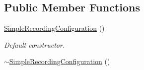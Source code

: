 \subsection*{Public Member Functions}
\begin{DoxyCompactItemize}
\item 
\hypertarget{class_simple_recording_configuration_a97fce15654a90e949196a0ba9c0b32e6}{}\hyperlink{class_simple_recording_configuration_a97fce15654a90e949196a0ba9c0b32e6}{Simple\+Recording\+Configuration} ()\label{class_simple_recording_configuration_a97fce15654a90e949196a0ba9c0b32e6}

\begin{DoxyCompactList}\small\item\em Default constructor. \end{DoxyCompactList}\item 
\hypertarget{class_simple_recording_configuration_aecd963668a23f688305118b89c70c62a}{}\hyperlink{class_simple_recording_configuration_aecd963668a23f688305118b89c70c62a}{$\sim$\+Simple\+Recording\+Configuration} ()\label{class_simple_recording_configuration_aecd963668a23f688305118b89c70c62a}


\end{DoxyCompactItemize}
